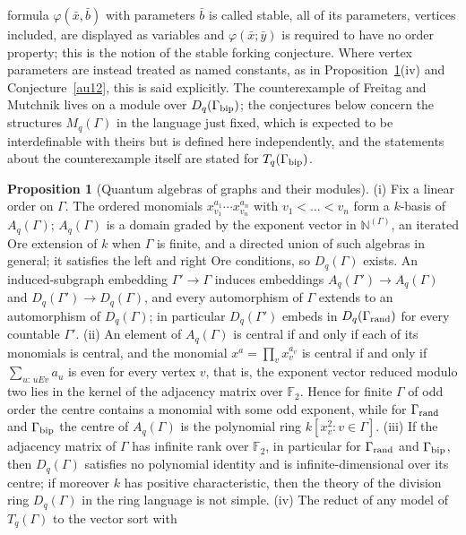 \documentclass[11pt]{article}
\theoremstyle{definition}
\newcommand{\Fq}{\mathbb F}
\newtheorem{proposition}{Proposition}
\begin{document}
formula $\varphi(\bar x,\bar b)$ with parameters $\bar b$ is called stable,
all of its parameters, vertices included, are displayed as variables and
$\varphi(\bar x;\bar y)$ is required to have no order property; this is the
notion of the stable forking conjecture.  Where vertex parameters are
instead treated as named constants, as in Proposition~\ref{au:basic}(iv)
and Conjecture~\ref{au12}, this is said explicitly.  The
counterexample of Freitag and Mutchnik lives on a module over
$D_q(\Gamma_{\rm bip})$; the conjectures below concern the structures
$M_q(\Gamma)$ in the language just fixed, which is expected to be
interdefinable with theirs but is defined here independently, and the
statements about the counterexample itself are stated for $T_q(\Gamma_{\rm bip})$.

\begin{proposition}[Quantum algebras of graphs and their modules]\label{au:basic}
{\rm(i)} Fix a linear order on $\Gamma$.  The ordered monomials
$x_{v_1}^{a_1}\cdots x_{v_n}^{a_n}$ with $v_1<\dots<v_n$ form a $k$-basis of
$A_q(\Gamma)$; $A_q(\Gamma)$ is a domain graded by the exponent vector in $\mathbb N^{(\Gamma)}$, an iterated Ore extension of $k$
when $\Gamma$ is finite, and a directed union of such algebras in general;
it satisfies the left and right Ore conditions, so $D_q(\Gamma)$ exists.
An induced-subgraph embedding $\Gamma'\to\Gamma$ induces embeddings
$A_q(\Gamma')\to A_q(\Gamma)$ and $D_q(\Gamma')\to D_q(\Gamma)$, and every
automorphism of $\Gamma$ extends to an automorphism of $D_q(\Gamma)$; in
particular $D_q(\Gamma')$ embeds in $D_q(\Gamma_{\rm rand})$ for every
countable $\Gamma'$.
{\rm(ii)} An element of $A_q(\Gamma)$ is central if and only if each of its
monomials is central, and the monomial $x^a=\prod_vx_v^{a_v}$ is central if
and only if $\sum_{u:\,uEv}a_u$ is even for every vertex $v$, that is, the
exponent vector reduced modulo two lies in the kernel of the adjacency
matrix over $\Fq_2$.  Hence for finite $\Gamma$ of odd order the centre
contains a monomial with some odd exponent, while for $\Gamma_{\rm rand}$
and $\Gamma_{\rm bip}$ the centre of $A_q(\Gamma)$ is the polynomial ring
$k[x_v^2:v\in\Gamma]$.
{\rm(iii)} If the adjacency matrix of $\Gamma$ has infinite
rank over $\Fq_2$, in particular for $\Gamma_{\rm rand}$ and
$\Gamma_{\rm bip}$, then $D_q(\Gamma)$ satisfies no polynomial identity and
is infinite-dimensional over its centre; if moreover $k$ has positive
characteristic, then the theory of the division ring $D_q(\Gamma)$ in the
ring language is not simple.
{\rm(iv)} The reduct of any model of $T_q(\Gamma)$ to the vector sort with

\end{proposition}
\end{document}
